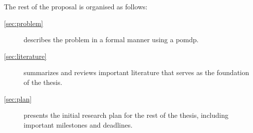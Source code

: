 The rest of the proposal is organised as follows:
\begin{description}
    \item[\cref{sec:problem}]
    describes the problem in a formal manner using a \gls{pomdp}.
    
    \item[\cref{sec:literature}]
    summarizes and reviews important literature that serves as the foundation of the thesis.
    
    \item[\cref{sec:plan}]
    presents the initial research plan for the rest of the thesis, including important milestones and deadlines.
\end{description}


\iffalse

\cite{hitl_pomdp} define a similar \gls{pomdp} problem. An agent is supposed to activate a warning signal if the driver is drowsy and actively interfere by steering the car if the warning is unsuccessful in alerting the driver. The model representing the transition probabilities of the driver's interal state and action choice in \cite{hitl_pomdp} are arbitrarily constructed and likewise very simplified. A more realistic driving setting also requires a more sophisticated driver model. 





\fi






